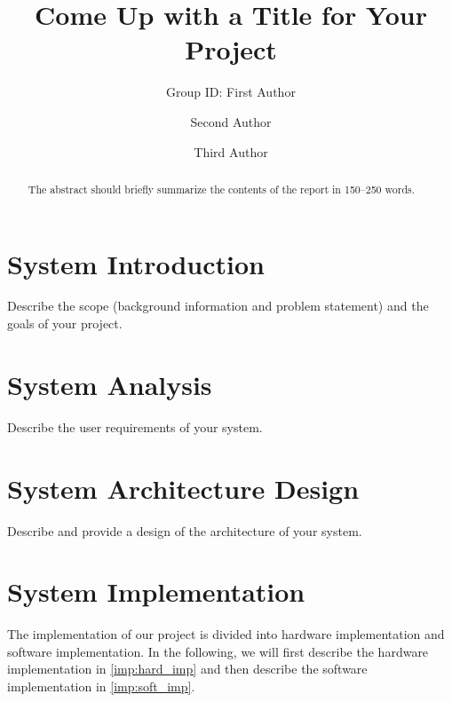 \documentclass[runningheads]{llncs}
\begin{document}
%
\title{Come Up with a Title for Your Project}

\author{Group ID: First Author \and
Second Author \and
Third Author}

%
\maketitle              %
%
\begin{abstract}
The abstract should briefly summarize the contents of the report in
150--250 words. 

\end{abstract}
%
%
%
\section{System Introduction}
Describe the scope (background information and problem statement) and the goals of your project.

\section{System Analysis}
Describe the user requirements of your system.

\section{System Architecture Design}
Describe and provide a design of the architecture of your system.

\section{System Implementation}
\label{sec:imp}
The implementation of our project is divided into hardware implementation and software implementation. In the following, we will first describe the hardware implementation in \ref{imp:hard_imp} and then describe the software implementation in \ref{imp:soft_imp}.
\end{document}
